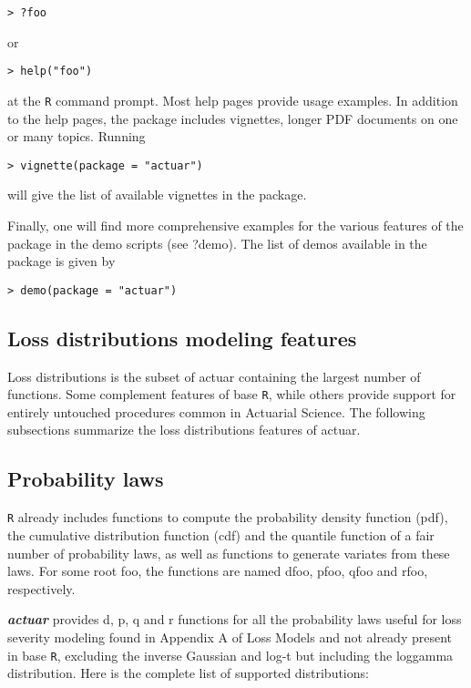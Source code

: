 \documentclass[12pt]{article}
\begin{document}
\begin{verbatim}
> ?foo
\end{verbatim}
or
\begin{verbatim}
> help("foo")
\end{verbatim}


at the \texttt{R} command prompt. Most help pages provide usage examples. In addition to the help pages, the package includes vignettes, longer PDF documents on one or many topics. Running 
\begin{verbatim}
> vignette(package = "actuar")
\end{verbatim}
will give the list of available vignettes in the package.

Finally, one will find more comprehensive examples for the various features of the package in the demo scripts (see ?demo). The list of demos available in the package is given by

\begin{verbatim}
> demo(package = "actuar")
\end{verbatim}


\subsection{Loss distributions modeling features}

Loss distributions is the subset of actuar containing the largest number of functions. Some complement features of base \texttt{R}, while others provide support for entirely untouched procedures common in Actuarial Science. The following subsections summarize the loss distributions features of actuar. 

\subsection{Probability laws}

\texttt{R} already includes functions to compute the probability density function (pdf), the cumulative distribution function (cdf) and the quantile function of a fair number of probability laws, as well as functions to generate variates from these laws. For some root foo, the functions are named dfoo, pfoo, qfoo and rfoo, respectively.

\textbf{\textit{actuar}} provides d, p, q and r functions for all the probability laws useful for loss severity modeling found in Appendix A of Loss Models and not already present in base \texttt{R}, excluding the inverse Gaussian and log-t but including the loggamma distribution. Here is the complete list of supported distributions:
\end{document}
